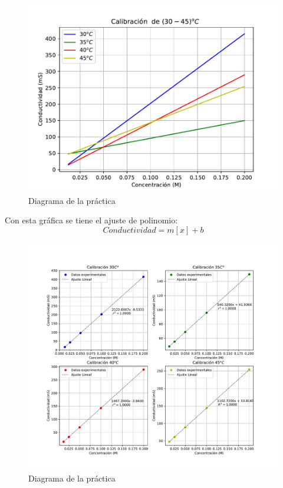 \begin{enumerate}
        \begin{figure}[H]
            \centering
            \includegraphics[scale = 0.8]{Figuras/calibracion_todos.pdf}
            \caption{Diagrama de la pr\'{a}ctica}
        \end{figure}

    Con esta gráfica se tiene el ajuste de polinomio:
            $$  Conductividad = m[x] + b$$



\end{enumerate}


\begin{figure}[H]
    \centering
    \includegraphics[scale=0.65]{Figuras/FiguraTodos.pdf}
    \caption{Diagrama de la pr\'{a}ctica}
\end{figure}

